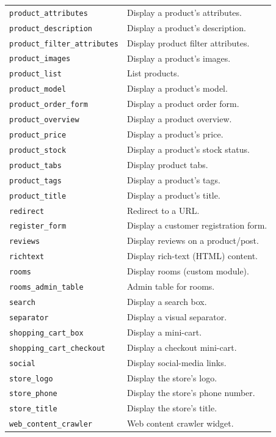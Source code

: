 \documentclass[11pt,a4paper]{article}
\begin{document}
\begin{longtable}{p{5.5cm}p{7.0cm}}
\texttt{product\_attributes}     & Display a product's attributes. \\
\texttt{product\_description}    & Display a product's description. \\
\texttt{product\_filter\_attributes} & Display product filter attributes. \\
\texttt{product\_images}         & Display a product's images. \\
\texttt{product\_list}           & List products. \\
\texttt{product\_model}          & Display a product's model. \\
\texttt{product\_order\_form}    & Display a product order form. \\
\texttt{product\_overview}       & Display a product overview. \\
\texttt{product\_price}          & Display a product's price. \\
\texttt{product\_stock}          & Display a product's stock status. \\
\texttt{product\_tabs}           & Display product tabs. \\
\texttt{product\_tags}           & Display a product's tags. \\
\texttt{product\_title}          & Display a product's title. \\
\texttt{redirect}                & Redirect to a URL. \\
\texttt{register\_form}          & Display a customer registration form. \\
\texttt{reviews}                 & Display reviews on a product/post. \\
\texttt{richtext}                & Display rich-text (HTML) content. \\
\texttt{rooms}                   & Display rooms (custom module). \\
\texttt{rooms\_admin\_table}     & Admin table for rooms. \\
\texttt{search}                  & Display a search box. \\
\texttt{separator}               & Display a visual separator. \\
\texttt{shopping\_cart\_box}     & Display a mini-cart. \\
\texttt{shopping\_cart\_checkout} & Display a checkout mini-cart. \\
\texttt{social}                  & Display social-media links. \\
\texttt{store\_logo}             & Display the store's logo. \\
\texttt{store\_phone}            & Display the store's phone number. \\
\texttt{store\_title}            & Display the store's title. \\
\texttt{web\_content\_crawler}   & Web content crawler widget. \\
\end{longtable}
\end{document}
